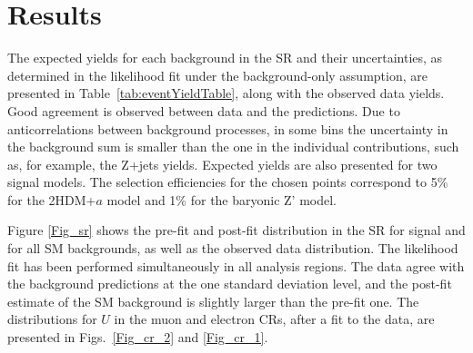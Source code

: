 \section{Results}

The expected yields for each background in the SR and their uncertainties, as determined in the likelihood fit under the background-only assumption, are presented in Table~\ref{tab:eventYieldTable}, along with the observed data yields.
Good agreement is observed between data and the predictions. Due to anticorrelations between background processes, in some bins the uncertainty in the background sum is smaller than the one in the individual contributions, such as, for example, the Z+jets yields. Expected yields are also presented for two signal models. The selection efficiencies for the chosen points correspond to 5\% for the 2HDM+$a$ model and 1\% for the baryonic Z' model. %


Figure \ref{Fig_sr} shows the pre-fit and post-fit \MET distribution in the SR for signal and for all SM backgrounds, as well as the observed data distribution. The likelihood fit has been performed simultaneously in all analysis regions. The data agree with the background predictions at the one standard deviation level, and the post-fit estimate of the SM background is slightly larger than the pre-fit one. The distributions for $U$ in the muon and electron CRs, after a fit to the data, are presented in Figs.~\ref{Fig_cr_2} and \ref{Fig_cr_1}.

